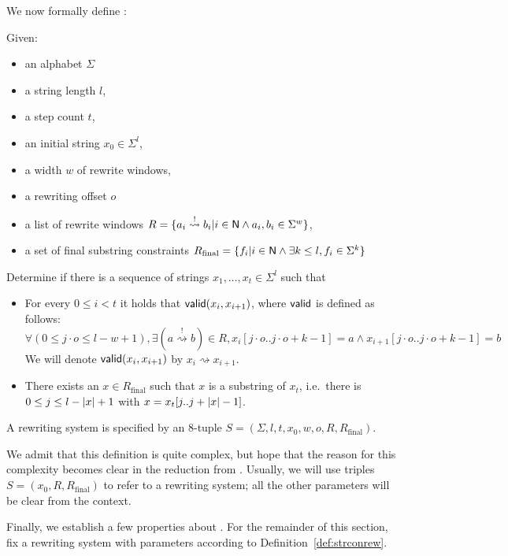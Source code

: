 \documentclass[a4paper,UKenglish,cleveref, autoref]{lipics-v2019}
\newcommand{\strent}{\rightsquigarrow}
\newcommand{\constrent}{\overset{!}{\rightsquigarrow}}
\newcommand{\Rfinal}{R_{\text{final}}}
\begin{document}
We now formally define \strconrew{}:
\begin{definition}\label{def:strconrew}
  Given: 
  \begin{itemize}
    \item an alphabet $\Sigma$
    \item a string length $l$,
    \item a step count $t$,
    \item an initial string $x_0 \in \Sigma^l$,
    \item a width $w$ of rewrite windows, 
    \item a rewriting offset $o$
    \item a list of rewrite windows $R = \{a_i \constrent b_i | i \in \nat \land a_i, b_i \in \Sigma^w\}$,
    \item a set of final substring constraints $\Rfinal = \{f_i | i \in \nat \land \exists k \le l, f_i \in \Sigma^k\}$
  \end{itemize}

  Determine if there is a sequence of strings $x_1, \ldots, x_t \in \Sigma^l$ such that 
  \begin{itemize}
    \item For every $0 \le i < t$ it holds that $\textsf{valid}(x_i, x_{i+1})$, where $\textsf{valid}$ is defined as follows:
      \[\forall (0 \le j\cdot o \le l -w + 1), \exists (a \constrent b) \in R, x_i[j\cdot o..j\cdot o+ k-1] = a \land x_{i+1}[j\cdot o..j\cdot o+k-1] = b \]
      We will denote $\textsf{valid}(x_i, x_{i+1})$ by $x_i \strent{} x_{i+1}$. 
    \item There exists an $x \in \Rfinal$ such that $x$ is a substring of $x_t$, i.e.\ there is $0 \le j \le l - |x| + 1$ with $x = x_t[j..j+|x| - 1]$.
  \end{itemize}

  A rewriting system is specified by an 8-tuple $S = (\Sigma, l, t, x_0, w, o, R, \Rfinal)$.
\end{definition}

We admit that this definition is quite complex, but hope that the reason for this complexity becomes clear in the reduction from \gennp{}.
Usually, we will use triples $S = (x_0, R, \Rfinal)$ to refer to a rewriting system; all the other parameters will be clear from the context.

Finally, we establish a few properties about \strconrew{}. For the remainder of this section, fix a rewriting system with parameters according to Definition~\ref{def:strconrew}.
\end{document}
